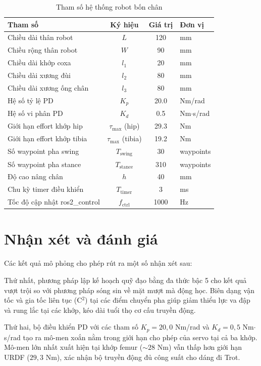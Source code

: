 \begin{table}[htbp]
\centering
\caption{Tham số hệ thống robot bốn chân}
\label{tab:thamso_robot}
\begin{tabular}{|l|c|c|l|}
\hline
\textbf{Tham số} & \textbf{Ký hiệu} & \textbf{Giá trị} & \textbf{Đơn vị} \\ \hline
Chiều dài thân robot & $L$ & 120 & mm \\ \hline
Chiều rộng thân robot & $W$ & 90 & mm \\ \hline
Chiều dài khớp coxa & $l_1$ & 20 & mm \\ \hline
Chiều dài xương đùi & $l_2$ & 80 & mm \\ \hline
Chiều dài xương ống chân & $l_3$ & 80 & mm \\ \hline
Hệ số tỷ lệ PD & $K_p$ & 20.0 & Nm/rad \\ \hline
Hệ số vi phân PD & $K_d$ & 0.5 & Nm$\cdot$s/rad \\ \hline
Giới hạn effort khớp hip & $\tau_{\max}$ (hip) & 29.3 & Nm \\ \hline
Giới hạn effort khớp tibia & $\tau_{\max}$ (tibia) & 19.2 & Nm \\ \hline
Số waypoint pha swing & $T_{\text{swing}}$ & 30 & waypoints \\ \hline
Số waypoint pha stance & $T_{\text{stance}}$ & 310 & waypoints \\ \hline
Độ cao nâng chân & $h$ & 40 & mm \\ \hline
Chu kỳ timer điều khiển & $T_{\text{timer}}$ & 3 & ms \\ \hline
Tốc độ cập nhật ros2\_control & $f_{\text{ctrl}}$ & 1000 & Hz \\ \hline
\end{tabular}
\end{table}

\section{Nhận xét và đánh giá}
Các kết quả mô phỏng cho phép rút ra một số nhận xét sau:

Thứ nhất, phương pháp lập kế hoạch quỹ đạo bằng đa thức bậc 5 cho kết quả vượt trội so với phương pháp sóng sin về mặt mượt mà động học. Biên dạng vận tốc và gia tốc liên tục (C$^2$) tại các điểm chuyển pha giúp giảm thiểu lực va đập và rung lắc tại các khớp, kéo dài tuổi thọ cơ cấu truyền động.

Thứ hai, bộ điều khiển PD với các tham số $K_p = 20{,}0$ Nm/rad và $K_d = 0{,}5$ Nm$\cdot$s/rad tạo ra mô-men xoắn nằm trong giới hạn cho phép của servo tại cả ba khớp. Mô-men lớn nhất xuất hiện tại khớp femur ($\sim 28$ Nm) vẫn thấp hơn giới hạn URDF ($29{,}3$ Nm), xác nhận bộ truyền động đủ công suất cho dáng đi Trot.

